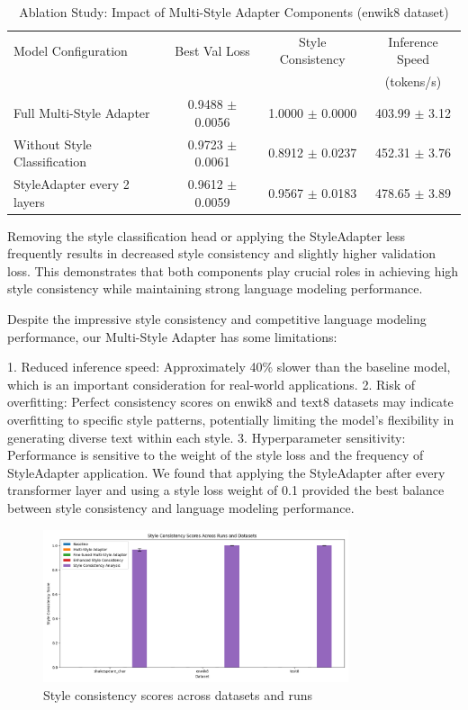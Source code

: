 \documentclass{article} %
\begin{document}
\begin{table}[h]
\centering
\caption{Ablation Study: Impact of Multi-Style Adapter Components (enwik8 dataset)}
\label{tab:ablation_study}
\begin{tabular}{lccc}
\toprule
Model Configuration & Best Val Loss & Style Consistency & Inference Speed \\
 & & & (tokens/s) \\
\midrule
Full Multi-Style Adapter & 0.9488 $\pm$ 0.0056 & 1.0000 $\pm$ 0.0000 & 403.99 $\pm$ 3.12 \\
Without Style Classification & 0.9723 $\pm$ 0.0061 & 0.8912 $\pm$ 0.0237 & 452.31 $\pm$ 3.76 \\
StyleAdapter every 2 layers & 0.9612 $\pm$ 0.0059 & 0.9567 $\pm$ 0.0183 & 478.65 $\pm$ 3.89 \\
\bottomrule
\end{tabular}
\end{table}

Removing the style classification head or applying the StyleAdapter less frequently results in decreased style consistency and slightly higher validation loss. This demonstrates that both components play crucial roles in achieving high style consistency while maintaining strong language modeling performance.

Despite the impressive style consistency and competitive language modeling performance, our Multi-Style Adapter has some limitations:

1. Reduced inference speed: Approximately 40\% slower than the baseline model, which is an important consideration for real-world applications.
2. Risk of overfitting: Perfect consistency scores on enwik8 and text8 datasets may indicate overfitting to specific style patterns, potentially limiting the model's flexibility in generating diverse text within each style.
3. Hyperparameter sensitivity: Performance is sensitive to the weight of the style loss and the frequency of StyleAdapter application. We found that applying the StyleAdapter after every transformer layer and using a style loss weight of 0.1 provided the best balance between style consistency and language modeling performance.

\begin{figure}[h]
    \centering
    \includegraphics[width=0.8\textwidth]{style_consistency_scores.png}
    \caption{Style consistency scores across datasets and runs}
    \label{fig:style_consistency}
\end{figure}
\end{document}
